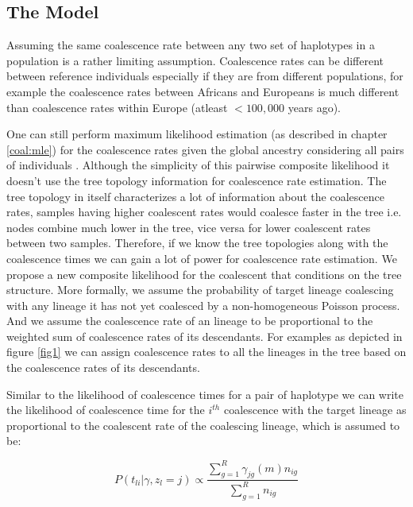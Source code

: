 
\subsection{The Model}
\label{the_model}
Assuming the same coalescence rate between any two set of haplotypes in a population is a rather limiting assumption. Coalescence rates can be different between reference individuals especially if they are from different populations, for example the coalescence rates between Africans and Europeans is much different than coalescence rates within Europe (atleast $<100,000$ years ago). 

One can still perform maximum likelihood estimation (as described in chapter \ref{coal:mle}) for the coalescence rates given the global ancestry considering all pairs of individuals \cite{li2011inference}. Although the simplicity of this pairwise composite likelihood it doesn't use the tree topology information for coalescence rate estimation. The tree topology in itself characterizes a lot of information about the coalescence rates, samples having higher coalescent rates would coalesce faster in the tree i.e. nodes combine much lower in the tree, vice versa for lower coalescent rates between two samples. Therefore, if we know the tree topologies along with the coalescence times we can gain a lot of power for coalescence rate estimation. We propose a new composite likelihood for the coalescent that conditions on the tree structure. More formally, we assume the probability of target lineage coalescing with any lineage it has not yet coalesced by a non-homogeneous Poisson process. And we assume the coalescence rate of an lineage to be proportional to the weighted sum of coalescence rates of its descendants. For examples as depicted in figure \ref{fig1} we can assign coalescence rates to all the lineages in the tree based on the coalescence rates of its descendants.  

Similar to the likelihood of coalescence times for a pair of haplotype we can write the likelihood of coalescence time for the $i^{th}$ coalescence with the target lineage as proportional to the coalescent rate of the coalescing lineage, which is assumed to be: 

\begin{equation}
P(t_{li} | \gamma, z_l = j)  \propto \frac{\sum_{g=1}^R\gamma_{jg}(m)n_{ig}}{\sum_{g=1}^R n_{ig}}
\end{equation}


